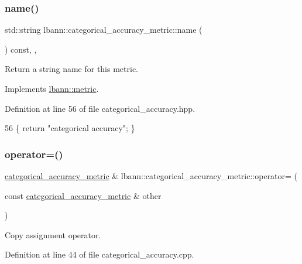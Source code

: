 \subsubsection{\texorpdfstring{name()}{name()}}
{\footnotesize\ttfamily std\+::string lbann\+::categorical\+\_\+accuracy\+\_\+metric\+::name (\begin{DoxyParamCaption}{ }\end{DoxyParamCaption}) const\hspace{0.3cm}{\ttfamily [inline]}, {\ttfamily [override]}, {\ttfamily [virtual]}}

Return a string name for this metric. 

Implements \hyperlink{classlbann_1_1metric_af455d7b6874d3491bc04f0f2ebfcab51}{lbann\+::metric}.



Definition at line 56 of file categorical\+\_\+accuracy.\+hpp.


\begin{DoxyCode}
56 \{ \textcolor{keywordflow}{return} \textcolor{stringliteral}{"categorical accuracy"}; \}
\end{DoxyCode}
\mbox{\label{classlbann_1_1categorical__accuracy__metric_a859f8e13d7222c92e32b6751b194ef47}} 
\subsubsection{\texorpdfstring{operator=()}{operator=()}}
{\footnotesize\ttfamily \hyperlink{classlbann_1_1categorical__accuracy__metric}{categorical\+\_\+accuracy\+\_\+metric} \& lbann\+::categorical\+\_\+accuracy\+\_\+metric\+::operator= (\begin{DoxyParamCaption}\item[{const \hyperlink{classlbann_1_1categorical__accuracy__metric}{categorical\+\_\+accuracy\+\_\+metric} \&}]{other }\end{DoxyParamCaption})}

Copy assignment operator. 

Definition at line 44 of file categorical\+\_\+accuracy.\+cpp.


